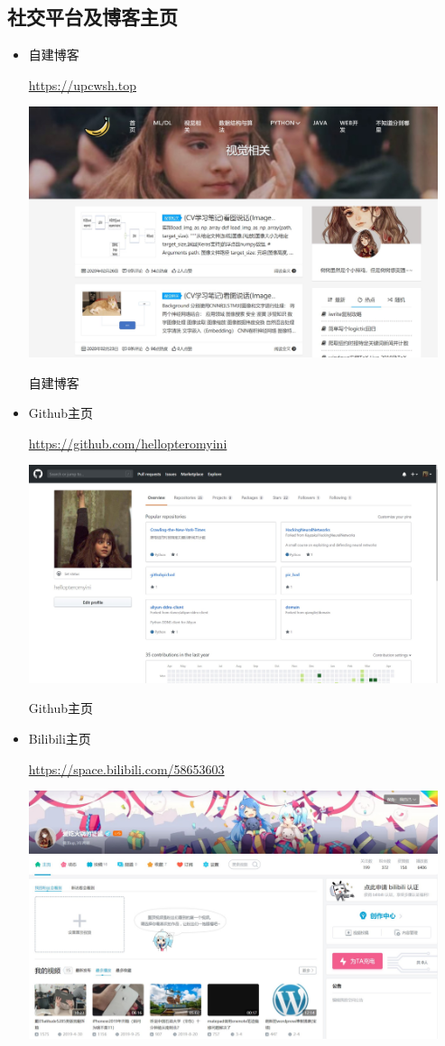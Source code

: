 \documentclass{article}
\begin{document}
\subsection{社交平台及博客主页}
\begin{itemize}
	\item 自建博客
	\par
	\url{https://upcwsh.top}
	\par
	\centerline{\includegraphics[width=12cm]{myblog}}
	\centerline{自建博客}	
	\par 
    \item Github主页
    \par
    \url{https://github.com/hellopteromyini}
    \par
	\centerline{\includegraphics[width=12cm]{github}}
    \centerline{Github主页}
	\par 
	\item Bilibili主页
	\par
	\url{https://space.bilibili.com/58653603}
	\par
	\centerline{\includegraphics[width=12cm]{bilibili}}

\end{itemize}
\end{document}
